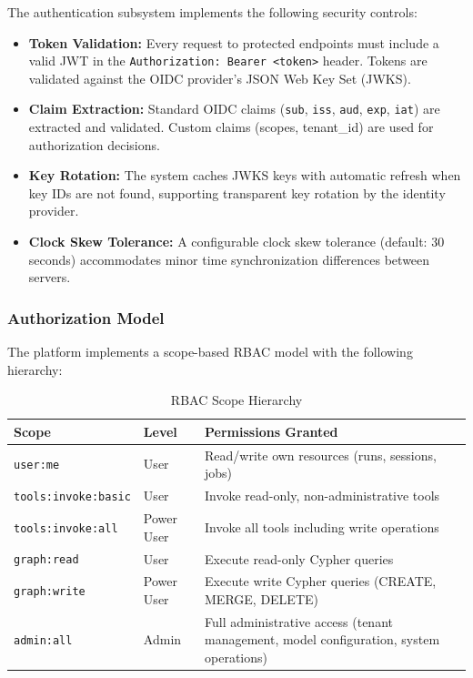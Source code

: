 The authentication subsystem implements the following security controls:

\begin{itemize}
    \item \textbf{Token Validation:} Every request to protected endpoints must include a valid JWT in the \texttt{Authorization: Bearer <token>} header. Tokens are validated against the OIDC provider's JSON Web Key Set (JWKS).
    
    \item \textbf{Claim Extraction:} Standard OIDC claims (\texttt{sub}, \texttt{iss}, \texttt{aud}, \texttt{exp}, \texttt{iat}) are extracted and validated. Custom claims (scopes, tenant\_id) are used for authorization decisions.
    
    \item \textbf{Key Rotation:} The system caches JWKS keys with automatic refresh when key IDs are not found, supporting transparent key rotation by the identity provider.
    
    \item \textbf{Clock Skew Tolerance:} A configurable clock skew tolerance (default: 30 seconds) accommodates minor time synchronization differences between servers.
\end{itemize}

\subsubsection{Authorization Model}

The platform implements a scope-based RBAC model with the following hierarchy:

\begin{table}[htbp]
\centering
\caption{RBAC Scope Hierarchy}
\label{tab:rbac-scopes}
\small
\begin{tabular}{|l|l|p{7cm}|}
\hline
\textbf{Scope} & \textbf{Level} & \textbf{Permissions Granted} \\
\hline
\texttt{user:me} & User & Read/write own resources (runs, sessions, jobs) \\
\hline
\texttt{tools:invoke:basic} & User & Invoke read-only, non-administrative tools \\
\hline
\texttt{tools:invoke:all} & Power User & Invoke all tools including write operations \\
\hline
\texttt{graph:read} & User & Execute read-only Cypher queries \\
\hline
\texttt{graph:write} & Power User & Execute write Cypher queries (CREATE, MERGE, DELETE) \\
\hline
\texttt{admin:all} & Admin & Full administrative access (tenant management, model configuration, system operations) \\
\hline
\end{tabular}
\end{table}

